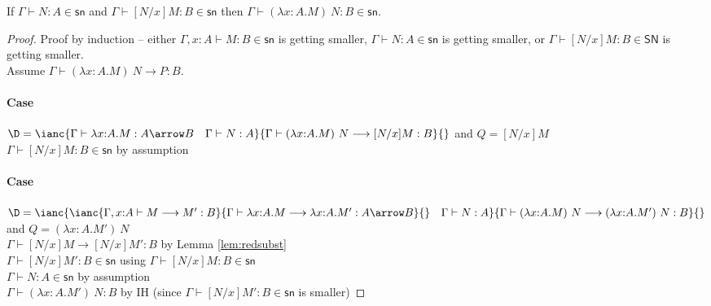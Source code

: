 \documentclass{article}
\newcommand{\SN}{\mathsf{SN}}
\newcommand{\csn}{\mathsf{sn}}
\newcommand{\red}{\longrightarrow}
\begin{document}
\begin{lemma}\label{lm:bclosed}
If $\Gamma \vdash N : A \in \csn$ and $\Gamma \vdash [N/x]M : B \in \csn$
then $\Gamma \vdash (\lambda x{:}A.M)~N : B \in \csn$.
\end{lemma}
\begin{proof}
Proof by induction -- either $\Gamma, x{:}A \vdash M : B \in \csn$ is getting smaller,
$\Gamma \vdash N : A \in \csn$ is getting smaller, or
$\Gamma \vdash [N/x]M : B \in \SN$  is getting smaller.\\[1em]
Assume $\Gamma \vdash (\lambda x{:}A.M)~N \red P : B$.

\paragraph{Case}
  $\D = \ianc {\Gamma \vdash \lambda x{:}A.M : A \arrow B
         \quad \Gamma \vdash  N : A}
              {\Gamma \vdash (\lambda x{:}A.M)~N  \red [N/x]M : B }{}$ and $ Q = [N/x]M$
 \\
$\Gamma \vdash [N/x]M : B \in \csn$ \hfill by assumption

\paragraph{Case}
 $\D = \ianc {\ianc{\Gamma, x{:}A \vdash M \red M' : B}
                   {\Gamma \vdash \lambda x{:}A.M \red \lambda x{:}A.M' : A \arrow B }{}
        \quad \Gamma \vdash N : A}
             {\Gamma \vdash (\lambda x{:}A.M)~N \red (\lambda x{:}A.M')~N : B}{}$
 and $Q = (\lambda x{:}A.M')~N$
\\[0.5em]
$\Gamma \vdash [N/x]M \red [N/x]M' : B$ \hfill by Lemma \ref{lem:redsubst} \\
$\Gamma \vdash [N/x]M' : B \in \csn$ \hfill using $\Gamma \vdash [N/x]M : B \in \csn$ \\
$\Gamma \vdash N : A \in \csn$ \hfill by assumption \\
$\Gamma \vdash (\lambda x{:}A.M')~N : B$ \hfill by IH (since $\Gamma \vdash [N/x]M' : B \in \csn$ is smaller)


\end{proof}
\end{document}
